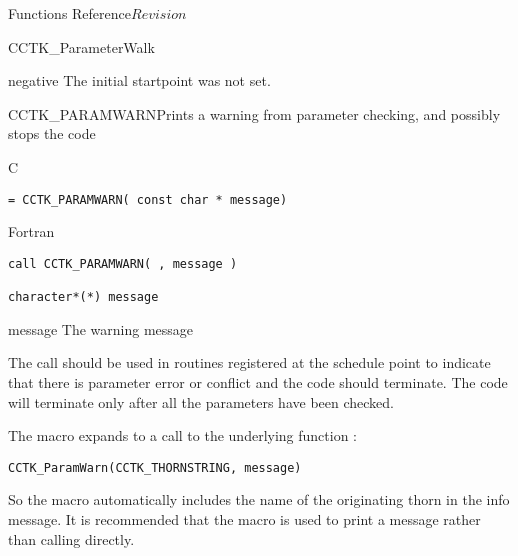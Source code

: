 \begin{cactuspart}{ Functions Reference}{}{$Revision$}
\begin{FunctionDescription}{CCTK\_ParameterWalk}
\begin{ErrorSection}
\begin{Error}{negative}
The initial startpoint was not set.
\end{Error}
\end{ErrorSection}
\end{FunctionDescription}


\begin{FunctionDescription}{CCTK\_PARAMWARN}{Prints a warning from parameter checking, and possibly stops the code}
\label{CCTK-PARAMWARN}
\begin{SynopsisSection}
\begin{Synopsis}{C}
\begin{verbatim}= CCTK_PARAMWARN( const char * message)\end{verbatim}
\end{Synopsis}
\begin{Synopsis}{Fortran}
\begin{verbatim}call CCTK_PARAMWARN( , message )

character*(*) message\end{verbatim}
\end{Synopsis}
\end{SynopsisSection}
\begin{ParameterSection}
\begin{Parameter}{message}
The warning message
\end{Parameter}
\end{ParameterSection}
\begin{Discussion}
The call should be used in routines registered at the schedule point 
to indicate that there is parameter error or conflict and the code should
terminate. The code will terminate only after all the parameters have been
checked.

The macro  expands to a call to the
underlying function :

\begin{verbatim}
CCTK_ParamWarn(CCTK_THORNSTRING, message)
\end{verbatim}

So the macro automatically includes the name of the originating thorn in the
info message. It is recommended that the macro  is used
to print a message rather than calling  directly.


\end{Discussion}
\end{FunctionDescription}
\end{cactuspart}

